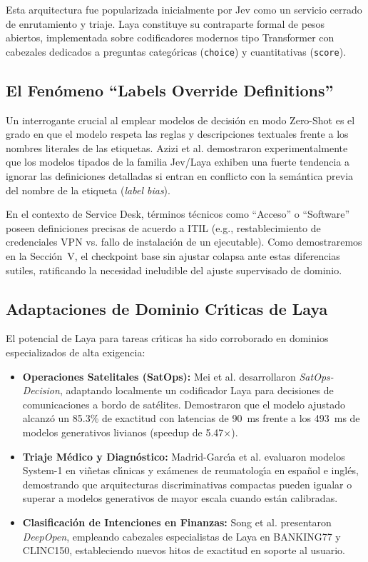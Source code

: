 \documentclass[10pt,journal,compsoc]{IEEEtran}
\begin{document}
Esta arquitectura fue popularizada inicialmente por Jev \cite{li2026fast, azizi2026labels} como un servicio cerrado de enrutamiento y triaje. Laya \cite{convai2026laya} constituye su contraparte formal de pesos abiertos, implementada sobre codificadores modernos tipo Transformer \cite{clark2024modernbert} con cabezales dedicados a preguntas categ\'oricas (\texttt{choice}) y cuantitativas (\texttt{score}).

\subsection{El Fen\'omeno ``Labels Override Definitions''}
Un interrogante crucial al emplear modelos de decisi\'on en modo Zero-Shot es el grado en que el modelo respeta las reglas y descripciones textuales frente a los nombres literales de las etiquetas. Azizi et al. \cite{azizi2026labels} demostraron experimentalmente que los modelos tipados de la familia Jev/Laya exhiben una fuerte tendencia a ignorar las definiciones detalladas si entran en conflicto con la sem\'antica previa del nombre de la etiqueta (\emph{label bias}). 

En el contexto de Service Desk, t\'erminos t\'ecnicos como ``Acceso'' o ``Software'' poseen definiciones precisas de acuerdo a ITIL (e.g., restablecimiento de credenciales VPN vs. fallo de instalaci\'on de un ejecutable). Como demostraremos en la Secci\'on~V, el checkpoint base sin ajustar colapsa ante estas diferencias sutiles, ratificando la necesidad ineludible del ajuste supervisado de dominio.

\subsection{Adaptaciones de Dominio Cr\'{\i}ticas de Laya}
El potencial de Laya para tareas cr\'{\i}ticas ha sido corroborado en dominios especializados de alta exigencia:
\begin{itemize}
    \item \textbf{Operaciones Satelitales (SatOps):} Mei et al. \cite{mei2026satops} desarrollaron \emph{SatOps-Decision}, adaptando localmente un codificador Laya para decisiones de comunicaciones a bordo de sat\'elites. Demostraron que el modelo ajustado alcanz\'o un 85.3\% de exactitud con latencias de 90~ms frente a los 493~ms de modelos generativos livianos (speedup de 5.47$\times$).
    \item \textbf{Triaje M\'edico y Diagn\'ostico:} Madrid-Garc\'{\i}a et al. \cite{madridgarcia2026rheumatology} evaluaron modelos System-1 en vi\~netas cl\'{\i}nicas y ex\'amenes de reumatolog\'{\i}a en espa\~nol e ingl\'es, demostrando que arquitecturas discriminativas compactas pueden igualar o superar a modelos generativos de mayor escala cuando est\'an calibradas.
    \item \textbf{Clasificaci\'on de Intenciones en Finanzas:} Song et al. \cite{song2026deepopen} presentaron \emph{DeepOpen}, empleando cabezales especialistas de Laya en BANKING77 y CLINC150, estableciendo nuevos hitos de exactitud en soporte al usuario.
\end{itemize}
\end{document}

